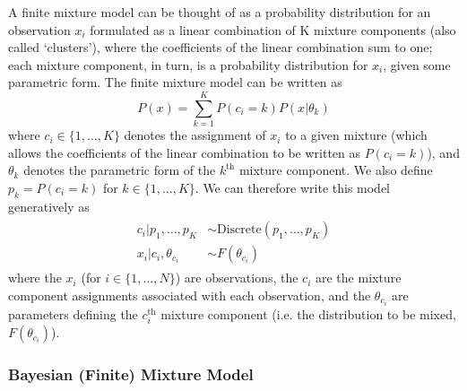 \documentclass[smallcondensed, final]{svjour3}
\begin{document}
A finite mixture model can be thought of as a probability distribution for an observation $x_{i}$ formulated as a linear combination of K mixture components (also called `clusters'), where the coefficients of the linear combination sum to one; each mixture component, in turn, is a probability distribution for $x_{i}$, given some parametric form. The finite mixture model can be written as
\begin{equation}
P(x) = \sum_{k=1}^{K} P(c_{i} = k)P(x|\theta_{k})
\end{equation}
where $c_{i} \in \{ 1, \ldots, K \}$ denotes the assignment of $x_{i}$ to a given mixture (which allows the coefficients of the linear combination to be written as $P(c_{i} = k)$), and $\theta_{k}$ denotes the parametric form of the $k^{\text{th}}$ mixture component. We also define $p_{k} = P(c_{i} = k)$ for $k \in \{ 1, \ldots, K \} $. We can therefore write this model generatively as
\begin{align}
\begin{split}
	c_{i}|p_{1}, \ldots, p_{K}  &\sim  \text{Discrete}(p_{1}, \ldots, p_{K}) \\
	x_{i}|c_{i}, \theta_{c_{i}}  &\sim  F(\theta_{c_{i}})
\end{split}
\end{align}
where the $x_{i}$ (for $i \in \{ 1, \ldots, N \}$) are observations, the $c_{i}$ are the mixture component assignments associated with each observation, and the $\theta_{c_{i}}$ are parameters defining the $c_{i}^{\text{th}}$ mixture component (i.e. the distribution to be mixed, $F(\theta_{c_{i}})$).



\subsubsection{Bayesian (Finite) Mixture Model}
\end{document}
